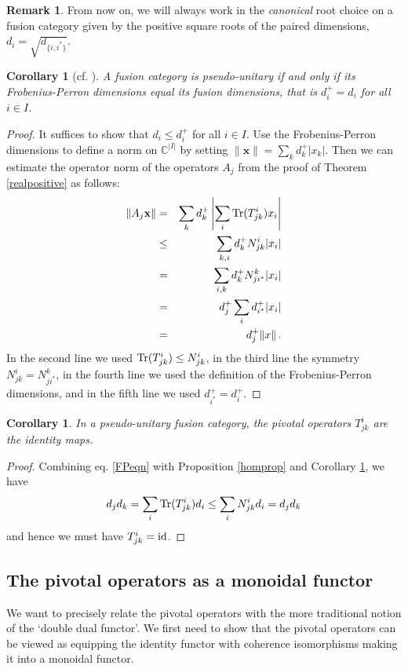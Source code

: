 \documentclass[a4paper]{article}
\theoremstyle{plain}
\newtheorem{cor}[thm]{Corollary}
\theoremstyle{definition}
\newtheorem{rem}[thm]{Remark}
\newcommand\id{\operatorname{\text{\rm id}}}
\newcommand{\Tr}{\operatorname{\text{\rm Tr}}}
\begin{document}
\begin{rem} From now on, we will always work in the {\em canonical} root choice on a fusion category given by the positive square roots of the paired dimensions, $d_i = \sqrt{d_{\{i, i^*\}}}$. 
\end{rem}
\begin{cor}[{cf. \cite[Prop 8.21]{eno02-ofc}}] A fusion category is pseudo-unitary if and only if its Frobenius-Perron dimensions equal its fusion dimensions, that is $d^+_i = d_i$ for all $i \in I$. \label{char_pseudo_cor}
\end{cor}
\begin{proof} It suffices to show that $d_i \leq d^+_i$ for all $i \in I$. Use the Frobenius-Perron dimensions to define a norm on $\mathbb{C}^{|I|}$ by setting $\| \mathbf{x} \| = \sum_k d^+_k |x_k|$. Then we can estimate the operator norm of the operators $A_j$ from the proof of Theorem \ref{realpositive} as follows:
\begin{eqnarray*}
 \| A_j \mathbf{x} \| &=& \sum_{k} d^+_k \left| \sum_i \Tr(T^i_{jk}) x_i \right| \\
	& \leq & \sum_{k, i} d^+_k  N^i_{jk} |x_i| \\
	& = & \sum_{i,k} d^+_k N^k_{j i^*} |x_i| \\
	& = & d^+_j \sum_i d^+_{i^*} |x_i| \\
	& = & d^+_j \|x\| \, .
\end{eqnarray*}
In the second line we used $\Tr(T^i_{jk}) \leq N^i_{jk}$, in the third line the symmetry $N^i_{jk} = N^k_{ji^*}$, in the fourth line we used the definition of the Frobenius-Perron dimensions, and in the fifth line we used $d^+_{i^*} = d^+_{i}$.
\end{proof}
\begin{cor} In a pseudo-unitary fusion category, the pivotal operators $T^i_{jk}$ are the identity maps. \label{pseudo_unitary}
\end{cor}
\begin{proof} Combining eq. \eqref{FPeqn} with Proposition \ref{homprop} and Corollary \ref{char_pseudo_cor}, we have
\[
d_j d_k = \sum_i \Tr(T^i_{jk}) d_i \leq \sum_i N^i_{jk} d_i = d_j d_k
\]
and hence we must have $T^i_{jk} = \id$.
\end{proof}


\subsection{The pivotal operators as a monoidal functor} \label{piv_monoidal}
We want to precisely relate the pivotal operators with the more traditional notion of the `double dual functor'. We first need to show that the pivotal operators can be viewed as equipping the identity functor with coherence isomorphisms making it into a monoidal functor. 
\end{document}
